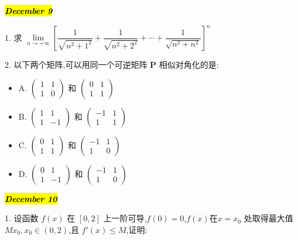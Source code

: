 \hl{\textbf{\textit{December 9}}}

1. 求 $\lim\limits_{n\rightarrow +\infty}\left[ \dfrac{1}{\sqrt{n^{2}+1^{2}}}+\dfrac{1}{\sqrt{n^{2}+2^{2}}}+\cdots+\dfrac{1}{\sqrt{n^{2}+n^{2}}}\right]^{n}$
\begin{solution}
	
\end{solution}

2. 以下两个矩阵,可以用同一个可逆矩阵 $\mathbf{P}$ 相似对角化的是:
\begin{itemize}
	\item A.\quad 
	$\begin{pmatrix}
		1 & 1\\
		1 & 0
	\end{pmatrix}$ 和
	$\begin{pmatrix}
		0 & 1\\
		1 & 1
	\end{pmatrix}$
	\item B.\quad 
	$\begin{pmatrix}
		1 & 1\\
		1 &-1
	\end{pmatrix}$ 和
	$\begin{pmatrix}
	   -1 & 1\\
		1 & 1
	\end{pmatrix}$
	\item C.\quad
	 $\begin{pmatrix}
		0 & 1\\
		1 & 1
	\end{pmatrix}$ 和
	$\begin{pmatrix}
	   -1 & 1\\
		1 & 0
	\end{pmatrix}$
	\item D.\quad 
	$\begin{pmatrix}
		0 & 1\\
		1 &-1
	\end{pmatrix}$ 和
	$\begin{pmatrix}
	   -1 & 1\\
		1 & 0
	\end{pmatrix}$
\end{itemize}
\begin{solution}
	
\end{solution}

\hl{\textbf{\textit{December 10}}}

1. 设函数 $f(x)$ 在 $[0,2]$ 上一阶可导,$f(0)=0$,$f(x)$在$x=x_{0}$ 处取得最大值 $Mx_{0},x_{0}\in(0,2)$,且 $f'(x)\leq M$,证明:

